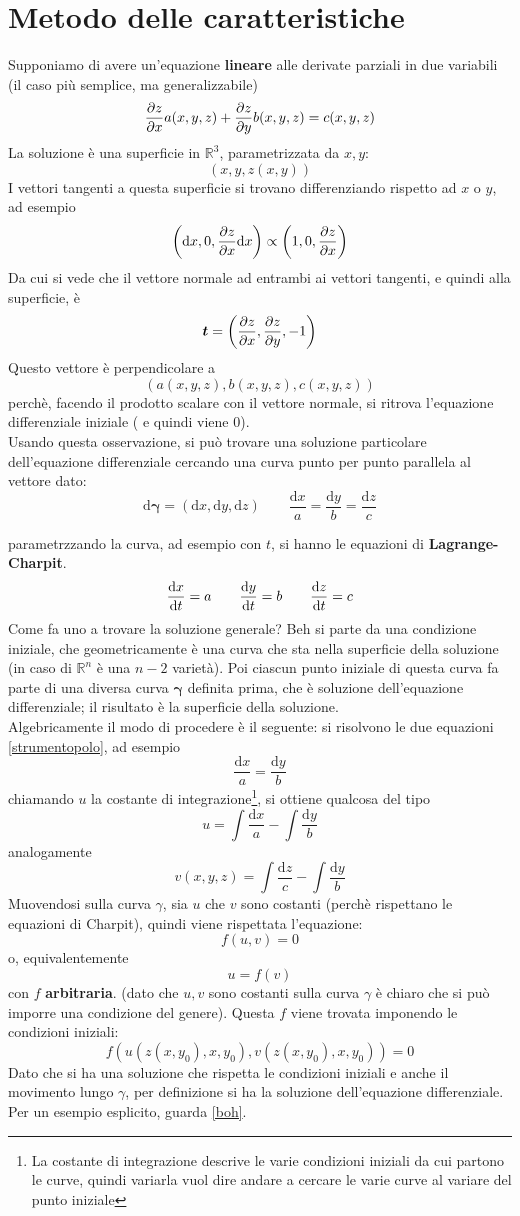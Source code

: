 \documentclass[a4paper,12pt]{article}
\theoremstyle{plain}
\renewcommand{\vec}[1]{{\boldsymbol{#1}}}
\theoremstyle{definition}
\newcommand{\f}[2]{\frac{#1}{#2}}
\renewcommand{\d}{\text{d}}
\theoremstyle{remark}
\begin{document}
\section{Metodo delle caratteristiche}\label{nonhoidee}
Supponiamo di avere un'equazione \textbf{lineare} alle derivate parziali in due variabili (il caso più semplice, ma generalizzabile)
\[\pdv{z}{x} a(x,y,z)+\pdv{z}{y}b(x,y,z)=c(x,y,z)\]
La soluzione è una superficie in $\mathbb{R}^3$, parametrizzata da $x,y$:
\[(x,y,z(x,y))\]
I vettori tangenti a questa superficie si trovano differenziando rispetto ad $x$ o $y$, ad esempio
\[\left(\d x,0,\pdv{z}{x}\d x\right)\propto\left(1,0,\pdv{z}{x}\right)\]
Da cui si vede che il vettore normale ad entrambi ai vettori tangenti, e quindi alla superficie, è
\[\vec{t}=\left(\pdv{z}{x},\pdv{z}{y},-1\right)\]
Questo vettore è perpendicolare a
\[\left(a(x,y,z),b(x,y,z),c(x,y,z)\right)\]
perchè, facendo il prodotto scalare con il vettore normale, si ritrova l'equazione differenziale iniziale ( e quindi viene $0$).\\
Usando questa osservazione, si può trovare una soluzione particolare dell'equazione differenziale cercando una curva punto per punto parallela al vettore dato:
\begin{equation}
	\d \vec{\gamma}=\left(\d x,\d y,\d z\right)\quad\quad \f{\d x}{a}=\f{\d y}{b}=\f{\d z}{c}\label{strumentopolo}		
\end{equation}

parametrzzando la curva, ad esempio con $t$, si hanno le equazioni di \textbf{Lagrange-Charpit}.
\[\dv{x}{t}=a\quad\quad\dv{y}{t}=b\quad\quad \dv{z}{t}=c\]
Come fa uno a trovare la soluzione generale? Beh si parte da una condizione iniziale, che geometricamente è una curva  che sta nella superficie della soluzione (in caso di $\mathbb{R}^n$ è una $n-2$ varietà). Poi ciascun punto iniziale di questa curva fa parte di una diversa curva $\vec{\gamma}$ definita prima, che è soluzione dell'equazione differenziale; il risultato è la superficie della soluzione.\\Algebricamente il modo di procedere è il seguente: 
si risolvono le due equazioni \ref{strumentopolo}, ad esempio
\[ \f{\d x}{a}=\f{\d y}{b}\]
chiamando $u$ la costante di integrazione\footnote{La costante di integrazione descrive le varie condizioni iniziali da cui partono le curve, quindi variarla vuol dire andare a cercare le varie curve al variare del punto iniziale}, si ottiene qualcosa del tipo\[u= \int\f{\d x}{a}-\int \f{\d y}{b} 	\]
analogamente
\[v(x,y,z)= \int\f{\d z}{c}-	\int \f{\d y}{b}\]
Muovendosi sulla curva $\gamma$, sia $u$ che $v$ sono costanti (perchè rispettano le equazioni di Charpit), quindi viene rispettata l'equazione:
\[f(u,v)=0\]
o, equivalentemente 
\[u=f(v)\]
con $f$ \textbf{arbitraria}. (dato che $u,v$ sono costanti sulla curva $\gamma$ è chiaro che si può imporre una condizione del genere). Questa $f$ viene trovata imponendo le condizioni iniziali:
\[f(u(z(x,y_0),x,y_0),v(z(x,y_0),x,y_0))=0\]
Dato che si ha una soluzione che rispetta le condizioni iniziali e anche il movimento lungo $\gamma$, per definizione si ha la soluzione dell'equazione differenziale.
\\Per un esempio esplicito, guarda \ref{boh}.
\end{document}

